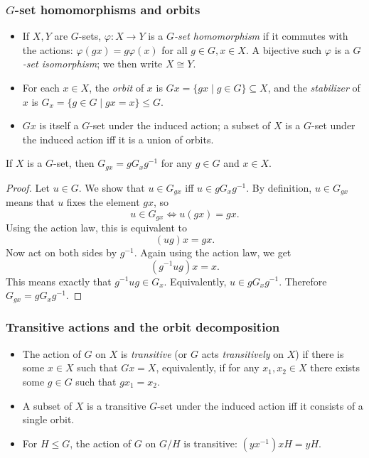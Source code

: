 \documentclass[../Odyssey_Project.tex]{subfiles}
\begin{document}
\subsubsection*{$G$-set homomorphisms and orbits}
\begin{itemize}
    \item If $X, Y$ are $G$-sets, $\varphi : X \to Y$ is a \emph{$G$-set homomorphism} if it commutes with the actions: $\varphi(gx) = g\varphi(x)$ for all $g \in G, x \in X$. A bijective such $\varphi$ is a \emph{$G$-set isomorphism}; we then write $X \cong Y$.
    \item For each $x \in X$, the \emph{orbit} of $x$ is $Gx = \{gx \mid g \in G\} \subseteq X$, and the \emph{stabilizer} of $x$ is $G_x = \{g \in G \mid gx = x\} \leq G$.
    \item $Gx$ is itself a $G$-set under the induced action; a subset of $X$ is a $G$-set under the induced action iff it is a union of orbits.
\end{itemize}

\begin{lemma}
\label{lem:3.2}
If $X$ is a $G$-set, then $G_{gx} = g G_x g^{-1}$ for any $g \in G$ and $x \in X$.
\end{lemma}

\begin{proof}
    Let $u \in G$. We show that $u \in G_{gx}$ iff $u \in gG_xg^{-1}$.
    By definition, $u \in G_{gx}$ means that $u$ fixes the element $gx$, so
    \[
        u \in G_{gx}
        \Longleftrightarrow u(gx) = gx.
    \]
    Using the action law, this is equivalent to
    \[
        (ug)x = gx.
    \]
    Now act on both sides by $g^{-1}$. Again using the action law, we get
    \[
        (g^{-1}ug)x = x.
    \]
    This means exactly that $g^{-1}ug \in G_x$. Equivalently, $u \in gG_xg^{-1}$.
    Therefore $G_{gx} = gG_xg^{-1}$.
\end{proof}

\subsubsection*{Transitive actions and the orbit decomposition}
\begin{itemize}
    \item The action of $G$ on $X$ is \emph{transitive} (or $G$ acts \emph{transitively} on $X$) if there is some $x \in X$ such that $Gx = X$, equivalently, if for any $x_1, x_2 \in X$ there exists some $g \in G$ such that $gx_1 = x_2$.
    \item A subset of $X$ is a transitive $G$-set under the induced action iff it consists of a single orbit.
    \item For $H \leq G$, the action of $G$ on $G/H$ is transitive: $(yx^{-1}) xH = yH$.
\end{itemize}
\end{document}
